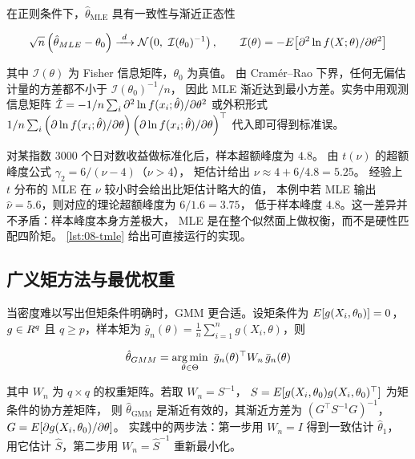在正则条件下，$\hat{\theta}_{\text{MLE}}$ 具有一致性与渐近正态性

\begin{equation}
  \sqrt{n}\left(\hat{\theta}_{MLE} - \theta_0\right)
  \xrightarrow{\ d\ } \mathcal{N}\!\left(0,\ \mathcal{I}(\theta_0)^{-1}\right), \qquad
  \mathcal{I}(\theta) = -E\!\left[\partial^2 \ln f(X;\theta)/\partial \theta^2\right]
  \label{eq:08-mleasym}
\end{equation}

其中 $\mathcal{I}(\theta)$ 为 Fisher 信息矩阵，$\theta_0$ 为真值。
由 Cramér--Rao 下界，任何无偏估计量的方差都不小于 $\mathcal{I}(\theta_0)^{-1}/n$，
因此 MLE 渐近达到最小方差。实务中用观测信息矩阵
$\hat{\mathcal{I}} = -1/n\sum_i \partial^2 \ln f(x_i;\hat{\theta})/\partial \theta^2$
或外积形式 $1/n\sum_i \left(\partial \ln f(x_i;\hat{\theta})/\partial \theta\right)\left(\partial \ln f(x_i;\hat{\theta})/\partial \theta\right)^{\top}$
代入即可得到标准误。

\begin{example}\label{ex:08-tmle}
对某指数 $3000$ 个日对数收益做标准化后，样本超额峰度为 $4.8$。
由 $t(\nu)$ 的超额峰度公式 $\gamma_2 = 6/(\nu-4)$（$\nu>4$），
矩估计给出 $\nu \approx 4 + 6/4.8 = 5.25$。
经验上 $t$ 分布的 MLE 在 $\nu$ 较小时会给出比矩估计略大的值，
本例中若 MLE 输出 $\hat{\nu} = 5.6$，则对应的理论超额峰度为 $6/1.6 = 3.75$，
低于样本峰度 $4.8$。这一差异并不矛盾：样本峰度本身方差极大，
MLE 是在整个似然面上做权衡，而不是硬性匹配四阶矩。
\cref{lst:08-tmle} 给出可直接运行的实现。
\end{example}

\subsection{广义矩方法与最优权重}

当密度难以写出但矩条件明确时，GMM 更合适。设矩条件为
$E[g(X_i,\theta_0)] = 0$，$g \in R^{q}$ 且 $q \ge p$，样本矩为
$\bar{g}_n(\theta) = \frac{1}{n}\sum_{i=1}^{n} g(X_i,\theta)$，则

\begin{equation}
  \hat{\theta}_{GMM} = \operatorname*{arg\,min}_{\theta \in \Theta}\ \bar{g}_n(\theta)^{\top} W_n\, \bar{g}_n(\theta)
  \label{eq:08-gmm}
\end{equation}

其中 $W_n$ 为 $q\times q$ 的权重矩阵。若取 $W_n = S^{-1}$，
$S = E[g(X_i,\theta_0)g(X_i,\theta_0)^{\top}]$ 为矩条件的协方差矩阵，
则 $\hat{\theta}_{\text{GMM}}$ 是渐近有效的，其渐近方差为
$(G^{\top}S^{-1}G)^{-1}$，$G = E[\partial g(X_i,\theta_0)/\partial \theta]$。
实践中的两步法：第一步用 $W_n = I$ 得到一致估计 $\hat{\theta}_1$，
用它估计 $\hat{S}$，第二步用 $W_n = \hat{S}^{-1}$ 重新最小化。

